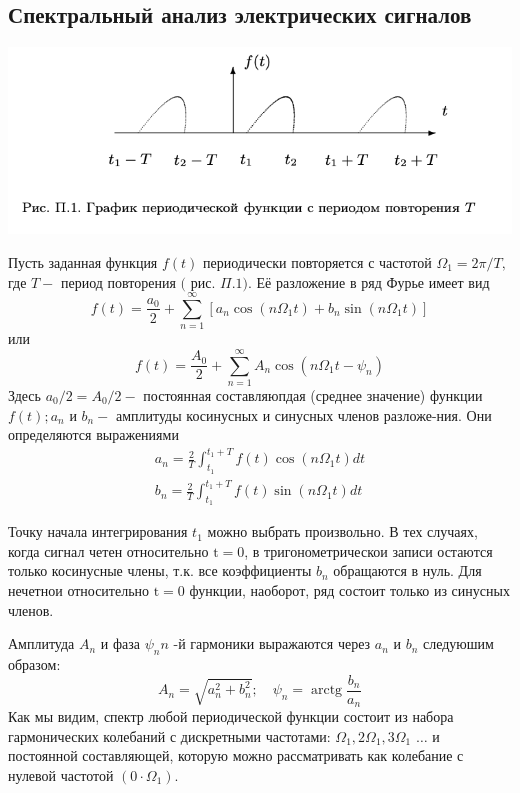 \documentclass[a4paper, 12pt]{article}%
\begin{document}
\subsection{Спектральный анализ электрических сигналов}

\begin{center}
\includegraphics[width=0.7\linewidth]{./anat/1.jpg}\\
\end{center}

Пусть заданная функция $f(t)$ периодически повторяется с частотой $\Omega_{1}=2 \pi / T,$ где $T-$ период повторения $($ рис. $\Pi .1) .$ Её разложение в ряд Фурье имеет вид
$$
f(t)=\frac{a_{0}}{2}+\sum_{n=1}^{\infty}\left[a_{n} \cos \left(n \Omega_{1} t\right)+b_{n} \sin \left(n \Omega_{1} t\right)\right]
$$
или
$$
f(t)=\frac{A_{0}}{2}+\sum_{n=1}^{\infty} A_{n} \cos \left(n \Omega_{1} t-\psi_{n}\right)
$$
Здесь $a_{0} / 2=A_{0} / 2-$ постоянная составляюпдая (среднее значение) функции $f(t) ; a_{n}$ и $b_{n}-$ амплитуды косинусных и синусных членов разложе-ния. Они определяются выражениями
$$
\begin{array}{l}
a_{n}=\frac{2}{T} \int_{t_{1}}^{t_{1}+T} f(t) \cos \left(n \Omega_{1} t\right) d t \\
b_{n}=\frac{2}{T} \int_{t_{1}}^{t_{1}+T} f(t) \sin \left(n \Omega_{1} t\right) d t
\end{array}
$$

Точку начала интегрирования $t_{1}$ можно выбрать произвольно. В тех случаях, когда сигнал четен относительно $\mathrm{t}=0$, в тригонометрическои записи остаются только косинусные члены, т.к. все коэффициенты $b_{n}$ обращаются в нуль. Для нечетнои относительно $\mathrm{t}=0$ функции, наоборот, ряд состоит только из синусных членов.

Амплитуда $A_{n}$ и фаза $\psi_{n} n$ -й гармоники выражаются через $a_{n}$ и $b_{n}$ следуюшим образом:
$$
A_{n}=\sqrt{a_{n}^{2}+b_{n}^{2}} ; \quad \psi_{n}=\operatorname{arctg} \frac{b_{n}}{a_{n}}
$$
Как мы видим, спектр любой периодической функции состоит из набора гармонических колебаний с дискретными частотами: $\Omega_{1}, 2 \Omega_{1}, 3 \Omega_{1}$ $\ldots$ и постоянной составляющей, которую можно рассматривать как колебание с нулевой частотой $\left(0 \cdot \Omega_{1}\right) .$
\end{document}
